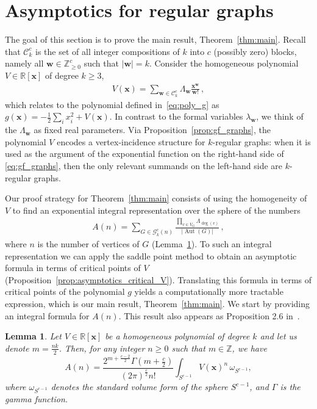 \documentclass[a4paper,oneside]{amsart}
\newcommand{\bb}[1]{\boldsymbol{#1}}
\numberwithin{theorem}{section}
\newtheorem{lemma}[theorem]{Lemma}
\theoremstyle{remark}
\newcommand{\R}{\mathbb{R}}
\newcommand{\Z}{\mathbb{Z}}
\DeclareMathOperator{\Aut}{Aut}
\begin{document}
\section{Asymptotics for regular graphs}\label{sec:asymptotic}

The goal of this section is to prove the main result, Theorem~\ref{thm:main}.
Recall that $\mathcal C_k^c$ is the set of all integer compositions of $k$ into $c$ (possibly zero) blocks, namely all $\bb w\in \Z_{\geq 0}^c$ such that $|\bb w| = k$. 
Consider the homogeneous polynomial $V \in \R[\bb x]$ of degree $k\geq 3$,
\begin{align*}
V(\bb x) = 
\sum_{ \bb w \in\mathcal C_k^c
}
\Lambda_{\bb w}
\frac{\bb x^{\bb w}}{\bb w!}\, ,
\end{align*}
which relates to the polynomial defined in~\eqref{eq:poly_g} as $g(\bb x) = -\tfrac{1}{2}\sum_i x_i^2 + V(\bb x)$. In contrast to the formal variables $\lambda_{\bb w}$, we think of the $\Lambda_{\bb w}$ as fixed real parameters.
Via Proposition~\ref{prop:gf_graphs}, the polynomial $V$ encodes a vertex-incidence structure for $k$-regular graphs: when it is used as the argument of the exponential function on the right-hand side of \eqref{eq:gf_graphs}, then the only relevant summands on the left-hand side are $k$-regular graphs.\par

Our proof strategy for Theorem~\ref{thm:main} consists of using the homogeneity of $V$ to find an exponential integral representation over the sphere of the numbers
\begin{align}
\label{eq:An}
A(n) =
\sum_{G \in \mathcal G_k^c(n)}
\frac{\prod_{v\in V_G} \Lambda_{\deg(v)}}
{|\Aut(G)|}\, ,
\end{align}
where $n$ is the number of vertices of $G$ (Lemma~\ref{lem:An_exp_integral}). To such an integral representation we can apply the saddle point method to obtain an asymptotic formula in terms of critical points of $V$ (Proposition~\ref{prop:asymptotics_critical_V}). 
Translating this formula in terms of critical points of the polynomial $g$ yields a computationally more tractable expression, which is our main result, Theorem~\ref{thm:main}. We start by providing an integral formula for $A(n)$. This result also appears as Proposition 2.6 in~\cite{LeeYang}.

\begin{lemma}
  \label{lem:An_exp_integral}
  Let $V\in \R[\bb{x}]$ be a homogeneous polynomial of degree $k$ and let us denote $m = \tfrac{n k}{2}$. Then, for any integer $n\geq 0$ such that $m\in\Z$, we have
  \begin{equation}
    \label{eq:An_exp_integral}
    A(n) = \frac{2^{m + \frac{c-2}{2}} \Gamma\left(m +\tfrac{c}{2}\right)}{(2\pi)^{\frac{c}{2}} n!} \int_{S^{c-1}} V(\bb{x})^{n} \,\omega_{S^{c-1}},
  \end{equation}
  where $\omega_{S^{c-1}}$ denotes the standard volume form of the sphere $S^{c-1}$, and $\Gamma$ is the gamma function.
\end{lemma}
\end{document}
